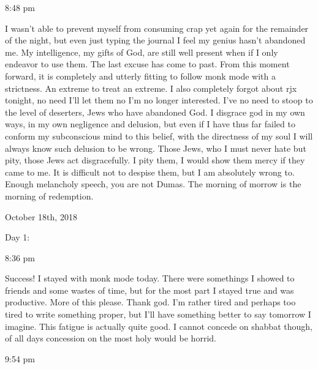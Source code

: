 8:48 pm

I wasn't able to prevent myself from consuming crap yet again for the
remainder of the night, but even just typing the journal I feel my
genius hasn't abandoned me. My intelligence, my gifts of God, are still
well present when if I only endeavor to use them. The last excuse has
come to past. From this moment forward, it is completely and utterly
fitting to follow monk mode with a strictness. An extreme to treat an
extreme. I also completely forgot about rjx tonight, no need I'll let
them no I'm no longer interested. I've no need to stoop to the level of
deserters, Jews who have abandoned God. I disgrace god in my own ways,
in my own negligence and delusion, but even if I have thus far failed to
conform my subconscious mind to this belief, with the directness of my
soul I will always know such delusion to be wrong. Those Jews, who I
must never hate but pity, those Jews act disgracefully. I pity them, I
would show them mercy if they came to me. It is difficult not to despise
them, but I am absolutely wrong to. Enough melancholy speech, you are
not Dumas. The morning of morrow is the morning of redemption.

\bigskip
\bigskip
October 18th, 2018

Day 1:

8:36 pm

Success! I stayed with monk mode today. There were somethings I showed
to friends and some wastes of time, but for the most part I stayed true
and was productive. More of this please. Thank god. I'm rather tired and
perhaps too tired to write something proper, but I'll have something
better to say tomorrow I imagine. This fatigue is actually quite good. I
cannot concede on shabbat though, of all days concession on the most
holy would be horrid.

9:54 pm

